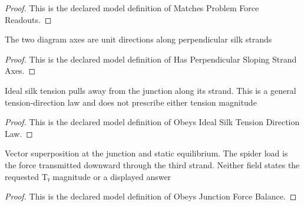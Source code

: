 \begin{proof}
  This is the declared model definition of Matches Problem Force Readouts.
\end{proof}
\begin{definition}
  \label{def:physics:phyx-mini-0681:phyxminiproblems-problemphyxmini0681-hasperpendicularslopingstrandaxes}
  The two diagram axes are unit directions along perpendicular silk strands
\end{definition}
\begin{proof}
  This is the declared model definition of Has Perpendicular Sloping Strand Axes.
\end{proof}
\begin{definition}
  \label{def:physics:phyx-mini-0681:phyxminiproblems-problemphyxmini0681-obeysidealsilktensiondirectionlaw}
  Ideal silk tension pulls away from the junction along its strand. This is a general tension-direction law and does not prescribe either tension magnitude
\end{definition}
\begin{proof}
  This is the declared model definition of Obeys Ideal Silk Tension Direction Law.
\end{proof}
\begin{definition}
  \label{def:physics:phyx-mini-0681:phyxminiproblems-problemphyxmini0681-obeysjunctionforcebalance}
  Vector superposition at the junction and static equilibrium. The spider load is the force transmitted downward through the third strand. Neither field states the requested Tᵧ magnitude or a displayed answer
\end{definition}
\begin{proof}
  This is the declared model definition of Obeys Junction Force Balance.
\end{proof}
